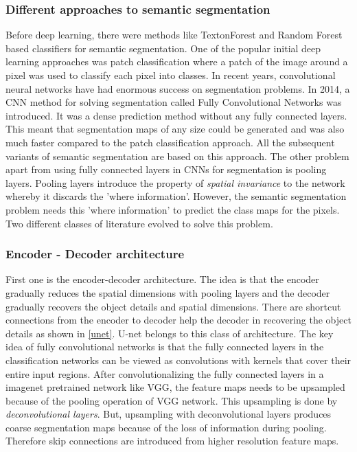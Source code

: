 \documentclass[a4paper, 12pt, oneside, BCOR1cm,toc=chapterentrywithdots]{scrbook}
\begin{document}
\subsubsection{Different approaches to semantic segmentation}

Before deep learning, there were methods like TextonForest\cite{shotton2008semantic} and Random Forest based classifiers for semantic segmentation. One of the popular initial deep learning approaches was patch classification \cite{ciresan2012deep} where a patch of the image around a pixel was used to classify each pixel into classes. In recent years, convolutional neural networks have had enormous success on segmentation problems. In 2014, a CNN method for solving segmentation called Fully Convolutional Networks \cite{long2015fully} was introduced. It was a dense prediction method without any fully connected layers. This meant that segmentation maps of any size could be generated and was also much faster compared to the patch classification approach. All the subsequent variants of semantic segmentation are based on this approach. The other problem apart from using fully connected layers in CNNs for segmentation is pooling layers. Pooling layers introduce the property of \textit{spatial invariance} to the network whereby it discards the 'where information'. However, the semantic segmentation problem needs this 'where information' to predict the class maps for the pixels. Two different classes of literature evolved to solve this problem. 


\subsubsection{Encoder - Decoder architecture}
First one is the encoder-decoder architecture. The idea is that the encoder gradually reduces the spatial dimensions with pooling layers and the decoder gradually recovers the object details and spatial dimensions. There are shortcut connections from the encoder to decoder help the decoder in recovering the object details as shown in \ref{unet}. U-net \cite{ronneberger2015u} belongs to this class of architecture. The key idea of fully convolutional networks\cite{long2015fully} is that the fully connected layers in the classification networks can be viewed as convolutions with kernels that cover their entire input regions. After convolutionalizing the fully connected layers in a imagenet pretrained network like VGG, the feature maps needs to be upsampled because of the pooling operation of VGG network. This upsampling is done by \textit{deconvolutional layers}. But, upsampling with deconvolutional layers produces coarse segmentation maps because of the loss of information during pooling. Therefore skip connections are introduced from higher resolution feature maps. 
\end{document}
